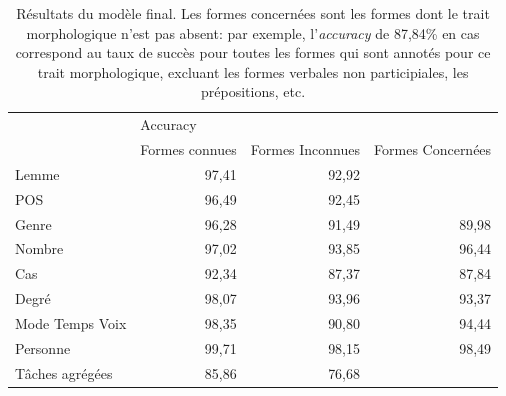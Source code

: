 \begin{table}[ht]
    \begin{tabular}{l|rrr}
    \toprule
                    & \multicolumn{3}{l}{Accuracy}                           \\
                    & Formes connues & Formes Inconnues &  Formes Concernées \\ \midrule
    Lemme           & 97,41          & 92,92            &                    \\
    POS             & 96,49          & 92,45            &                    \\
    Genre           & 96,28          & 91,49            &   89,98            \\
    Nombre          & 97,02          & 93,85            &   96,44            \\
    Cas             & 92,34          & 87,37            &   87,84            \\
    Degré           & 98,07          & 93,96            &   93,37            \\
    Mode Temps Voix & 98,35          & 90,80            &   94,44            \\
    Personne        & 99,71          & 98,15            &   98,49            \\ \midrule
    Tâches agrégées & 85,86          & 76,68            &                    \\ \bottomrule 
    \end{tabular}
    \caption{Résultats du modèle final. Les formes concernées sont les formes dont le trait morphologique n'est pas absent: par exemple, l'\textit{accuracy} de 87,84\% en cas correspond au taux de succès pour toutes les formes qui sont annotés pour ce trait morphologique, excluant les formes verbales non participiales, les prépositions, etc.}
    \label{tab:modelFinalLemmatisation}
\end{table}

